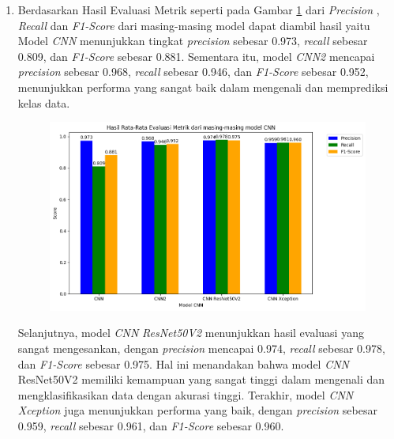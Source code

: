 \begin{enumerate}[nolistsep]
\item Berdasarkan Hasil Evaluasi Metrik seperti pada Gambar \ref{fig:GrafikPerbandinganEvaluasiMetrik} dari \textit{Precision} , \textit{Recall} dan \textit{F1-Score} dari masing-masing model dapat diambil hasil yaitu Model \textit{CNN} menunjukkan tingkat \textit{precision} sebesar 0.973, \textit{recall} sebesar 0.809, dan \textit{F1-Score} sebesar 0.881. Sementara itu, model \textit{CNN2} mencapai \textit{precision} sebesar 0.968, \textit{recall} sebesar 0.946, dan \textit{F1-Score} sebesar 0.952, menunjukkan performa yang sangat baik dalam mengenali dan memprediksi kelas data.
\begin{figure}[!hbt]
	\centering
	\includegraphics[width=0.7\linewidth]{gambar/bener/RataRataEvaluasiMetrik.png}
	\label{fig:GrafikPerbandinganEvaluasiMetrik}
\end{figure}
Selanjutnya, model \textit{CNN} \textit{ResNet50V2} menunjukkan hasil evaluasi yang sangat mengesankan, dengan \textit{precision} mencapai 0.974, \textit{recall} sebesar 0.978, dan \textit{F1-Score} sebesar 0.975. Hal ini menandakan bahwa model \textit{CNN} ResNet50V2 memiliki kemampuan yang sangat tinggi dalam mengenali dan mengklasifikasikan data dengan akurasi tinggi. Terakhir, model \textit{CNN} \textit{Xception} juga menunjukkan performa yang baik, dengan \textit{precision} sebesar 0.959, \textit{recall} sebesar 0.961, dan \textit{F1-Score} sebesar 0.960.


\end{enumerate}

